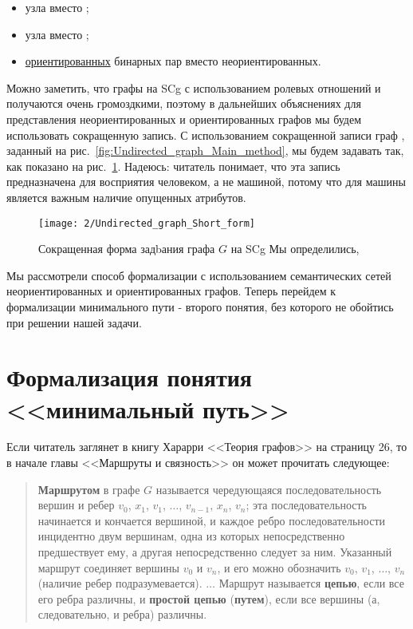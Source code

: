 \begin{itemize}
\item узла  вместо ;
\item узла  вместо ;
\item \underline{ориентированных} бинарных пар вместо
  неориентированных.
\end{itemize}

Можно заметить, что графы на SCg с использованием ролевых отношений
 и  получаются очень громоздкими, поэтому в
дальнейших объяснениях для представления неориентированных и
ориентированных графов мы будем использовать сокращенную запись. С
использованием сокращенной записи граф , заданный на
рис.~\ref{fig:Undirected_graph_Main_method}, мы будем задавать так,
как показано на рис.~\ref{fig:Undirected_graph_Short_form}. Надеюсь:
читатель понимает, что эта запись предназначена для восприятия
человеком, а не машиной, потому что для машины является важным наличие
опущенных атрибутов.

\begin{figure}[h!]
  \centering
  \texttt{[image: 2/Undirected\_graph\_Short\_form]}
  \caption{Сокращенная форма задbания графа $G$ на SCg Мы определились,}
  \label{fig:Undirected_graph_Short_form}
\end{figure}

Мы рассмотрели способ формализации с использованием семантических
сетей неориентированных и ориентированных графов. Теперь перейдем к
формализации минимального пути - второго понятия, без которого не
обойтись при решении нашей задачи.

\section{Формализация понятия <<минимальный путь>>}
\label{sec:Onto_form_min_path}

Если читатель заглянет в книгу Харарри <<Теория графов>> на страницу
26, то в начале главы <<Маршруты и связность>> он может прочитать
следующее:

\begin{quotation}
  \textbf{Маршрутом} в графе $G$ называется чередующаяся
  последовательность вершин и ребер $v_0$, $x_1$, $v_1$, $\dotsc$,
  $v_{n-1}$, $x_n$, $v_n$; эта последовательность начинается и
  кончается вершиной, и каждое ребро последовательности инцидентно
  двум вершинам, одна из которых непосредственно предшествует ему, а
  другая непосредственно следует за ним. Указанный маршрут соединяет
  вершины $v_0$ и $v_n$, и его можно обозначить $v_0$, $v_1$,
  $\dotsc$, $v_n$ (наличие ребер подразумевается). $\dots$ Маршрут
  называется \textbf{цепью}, если все его ребра различны, и
  \textbf{простой цепью} (\textbf{путем}), если все вершины (а,
  следовательно, и ребра) различны.
\end{quotation}

